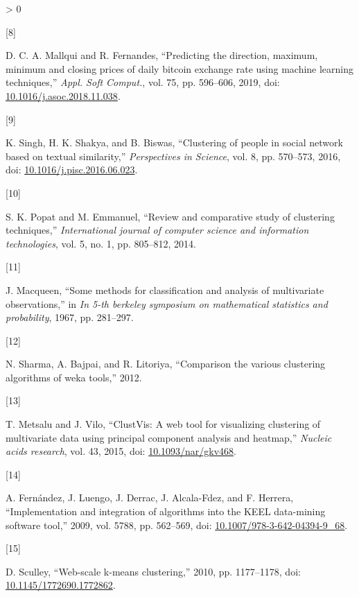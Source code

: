 \documentclass[
]{article}
\newlength{\cslhangindent}
\newlength{\csllabelwidth}
\newenvironment{CSLReferences}[3] %
 {%
  \setlength{\parindent}{0pt}
  \ifodd #1 \everypar{\setlength{\hangindent}{\cslhangindent}}\ignorespaces\fi
  \ifnum #2 > 0
  \setlength{\parskip}{#2\baselineskip}
  \fi
 }%
 {}
\newcommand{\CSLLeftMargin}[1]{\parbox[t]{\csllabelwidth}{#1}}
\newcommand{\CSLRightInline}[1]{\parbox[t]{\linewidth - \csllabelwidth}{#1}}
\begin{document}
\begin{CSLReferences}{0}{0}
\leavevmode\hypertarget{ref-Rdennysmallquifernandes2019}{}%
\CSLLeftMargin{{[}8{]} }
\CSLRightInline{D. C. A. Mallqui and R. Fernandes, {``Predicting the
direction, maximum, minimum and closing prices of daily bitcoin exchange
rate using machine learning techniques,''} \emph{Appl. Soft Comput.},
vol. 75, pp. 596--606, 2019, doi:
\href{https://doi.org/10.1016/j.asoc.2018.11.038}{10.1016/j.asoc.2018.11.038}.}

\leavevmode\hypertarget{ref-Rsinghshakyabiswas2016}{}%
\CSLLeftMargin{{[}9{]} }
\CSLRightInline{K. Singh, H. K. Shakya, and B. Biswas, {``Clustering of
people in social network based on textual similarity,''}
\emph{Perspectives in Science}, vol. 8, pp. 570--573, 2016, doi:
\href{https://doi.org/10.1016/j.pisc.2016.06.023}{10.1016/j.pisc.2016.06.023}.}

\leavevmode\hypertarget{ref-Rshraddhakm2014}{}%
\CSLLeftMargin{{[}10{]} }
\CSLRightInline{S. K. Popat and M. Emmanuel, {``Review and comparative
study of clustering techniques,''} \emph{International journal of
computer science and information technologies}, vol. 5, no. 1, pp.
805--812, 2014.}

\leavevmode\hypertarget{ref-Rmacqueen1967}{}%
\CSLLeftMargin{{[}11{]} }
\CSLRightInline{J. Macqueen, {``Some methods for classification and
analysis of multivariate observations,''} in \emph{In 5-th berkeley
symposium on mathematical statistics and probability}, 1967, pp.
281--297.}

\leavevmode\hypertarget{ref-Rnarendraamanratnesh2012}{}%
\CSLLeftMargin{{[}12{]} }
\CSLRightInline{N. Sharma, A. Bajpai, and R. Litoriya, {``Comparison the
various clustering algorithms of weka tools,''} 2012.}

\leavevmode\hypertarget{ref-Rtaunojaak2015}{}%
\CSLLeftMargin{{[}13{]} }
\CSLRightInline{T. Metsalu and J. Vilo, {``ClustVis: A web tool for
visualizing clustering of multivariate data using principal component
analysis and heatmap,''} \emph{Nucleic acids research}, vol. 43, 2015,
doi: \href{https://doi.org/10.1093/nar/gkv468}{10.1093/nar/gkv468}.}

\leavevmode\hypertarget{ref-Ralbertojulianjoaquinjesusfrancisco2009}{}%
\CSLLeftMargin{{[}14{]} }
\CSLRightInline{A. Fernández, J. Luengo, J. Derrac, J. Alcala-Fdez, and
F. Herrera, {``Implementation and integration of algorithms into the
KEEL data-mining software tool,''} 2009, vol. 5788, pp. 562--569, doi:
\href{https://doi.org/10.1007/978-3-642-04394-9_68}{10.1007/978-3-642-04394-9\_68}.}

\leavevmode\hypertarget{ref-Rsculley2010}{}%
\CSLLeftMargin{{[}15{]} }
\CSLRightInline{D. Sculley, {``Web-scale k-means clustering,''} 2010,
pp. 1177--1178, doi:
\href{https://doi.org/10.1145/1772690.1772862}{10.1145/1772690.1772862}.}


\end{CSLReferences}
\end{document}
